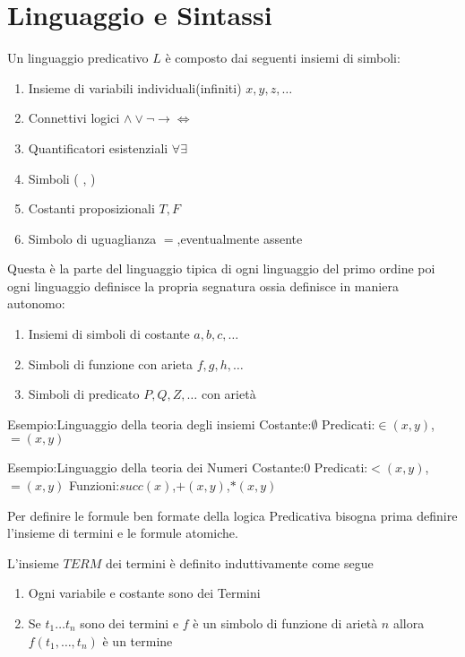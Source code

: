 \section{Linguaggio e Sintassi}
Un linguaggio predicativo $L$ è composto dai seguenti insiemi di simboli:
\begin{enumerate}
    \item Insieme di variabili individuali(infiniti) $x,y,z,\dots$
    \item Connettivi logici $\land \lor \neg \rightarrow \iff$
    \item Quantificatori esistenziali $\forall \exists$
    \item Simboli ( , )
    \item Costanti proposizionali $T,F$
    \item Simbolo di uguaglianza $=$,eventualmente assente
\end{enumerate}
Questa è la parte del linguaggio tipica di ogni linguaggio del primo ordine poi
ogni linguaggio definisce la propria segnatura ossia definisce in maniera autonomo:
\begin{enumerate}
    \item Insiemi di simboli di costante $a,b,c,\dots$
    \item Simboli di funzione con arieta $f,g,h,\dots$
    \item Simboli di predicato $P,Q,Z,\dots$ con arietà
\end{enumerate}

Esempio:Linguaggio della teoria degli insiemi \newline
Costante:$\emptyset$\newline
Predicati:$\in(x,y)$, $=(x,y)$

Esempio:Linguaggio della teoria dei Numeri \newline
Costante:$0$ \newline
Predicati:$<(x,y)$,$=(x,y)$ \newline
Funzioni:$succ(x)$,$+(x,y)$,$*(x,y)$

Per definire le formule ben formate della logica Predicativa bisogna prima definire
l'insieme di termini e le formule atomiche.

\begin{defi}
    L'insieme $TERM$ dei termini è definito induttivamente come segue
    \begin{enumerate}
        \item Ogni variabile e costante sono dei Termini
        \item Se $t_1 \dots t_n$ sono dei termini e $f$ è un simbolo di funzione di arietà $n$
              allora $f(t_1,\dots,t_n)$ è un termine
    \end{enumerate}
\end{defi}

